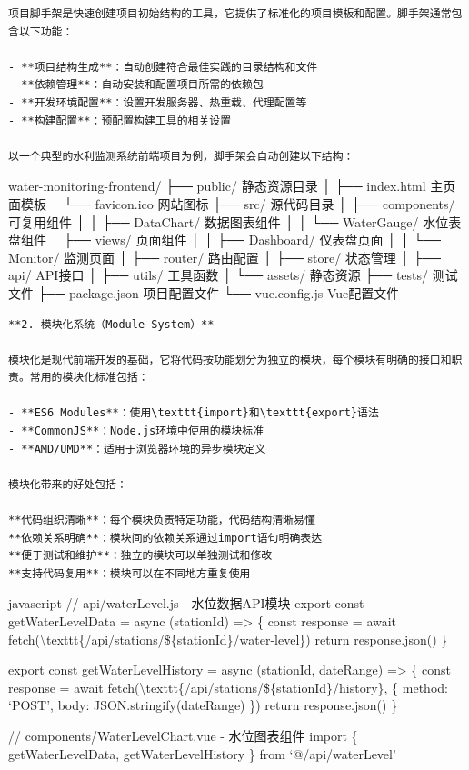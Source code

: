 {{\begin{lstlisting}
项目脚手架是快速创建项目初始结构的工具，它提供了标准化的项目模板和配置。脚手架通常包含以下功能：

- **项目结构生成**：自动创建符合最佳实践的目录结构和文件
- **依赖管理**：自动安装和配置项目所需的依赖包
- **开发环境配置**：设置开发服务器、热重载、代理配置等
- **构建配置**：预配置构建工具的相关设置

以一个典型的水利监测系统前端项目为例，脚手架会自动创建以下结构：
\end{lstlisting}

water-monitoring-frontend/ ├── public/  静态资源目录 │ ├── index.html  主页面模板 │ └── favicon.ico  网站图标 ├── src/  源代码目录 │ ├── components/  可复用组件 │ │ ├── DataChart/  数据图表组件 │ │ └── WaterGauge/  水位表盘组件 │ ├── views/  页面组件 │ │ ├── Dashboard/  仪表盘页面 │ │ └── Monitor/  监测页面 │ ├── router/  路由配置 │ ├── store/  状态管理 │ ├── api/  API接口 │ ├── utils/  工具函数 │ └── assets/  静态资源 ├── tests/  测试文件 ├── package.json  项目配置文件 └── vue.config.js  Vue配置文件

\begin{lstlisting}
**2. 模块化系统（Module System）**

模块化是现代前端开发的基础，它将代码按功能划分为独立的模块，每个模块有明确的接口和职责。常用的模块化标准包括：

- **ES6 Modules**：使用\texttt{import}和\texttt{export}语法
- **CommonJS**：Node.js环境中使用的模块标准
- **AMD/UMD**：适用于浏览器环境的异步模块定义

模块化带来的好处包括：

**代码组织清晰**：每个模块负责特定功能，代码结构清晰易懂
**依赖关系明确**：模块间的依赖关系通过import语句明确表达
**便于测试和维护**：独立的模块可以单独测试和修改
**支持代码复用**：模块可以在不同地方重复使用
\end{lstlisting}

javascript // api/waterLevel.js - 水位数据API模块 export const getWaterLevelData = async (stationId) =\textgreater{} \{ const response = await fetch(\textbackslash texttt\{/api/stations/\$\{stationId\}/water-level\}) return response.json() \}

export const getWaterLevelHistory = async (stationId, dateRange) =\textgreater{} \{ const response = await fetch(\textbackslash texttt\{/api/stations/\$\{stationId\}/history\}, \{ method: `POST', body: JSON.stringify(dateRange) \}) return response.json() \}

// components/WaterLevelChart.vue - 水位图表组件 import \{ getWaterLevelData, getWaterLevelHistory \} from `@/api/waterLevel'

}}
